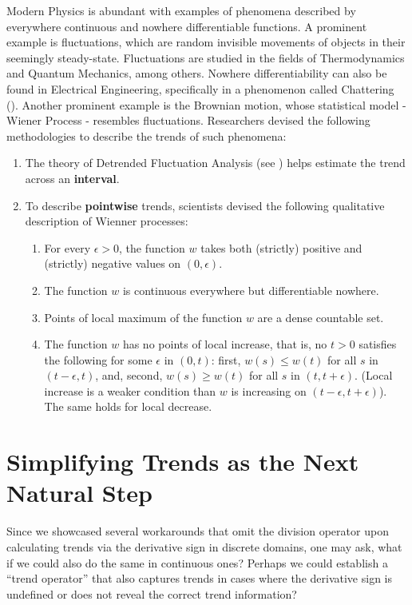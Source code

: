 \documentclass[11pt]{book}
\begin{document}
\label{nowhere_differentiability} Modern Physics is abundant with examples of
phenomena described by everywhere continuous and nowhere differentiable
functions. A prominent example is fluctuations, which are random invisible movements
of objects in their seemingly steady-state. Fluctuations are studied in the
fields of Thermodynamics and Quantum Mechanics, among others.
Nowhere differentiability can also be found in Electrical Engineering, specifically in a phenomenon
called Chattering (\cite{levant2010chattering}). Another prominent
example is the Brownian motion, whose statistical model - Wiener Process
- resembles fluctuations. Researchers devised the following methodologies
to describe the trends of such phenomena:
\begin{enumerate}
\item The theory of Detrended Fluctuation Analysis (see \cite{peng1994mosaic})
helps estimate the trend across an \textbf{interval}.
\item To describe \textbf{pointwise} trends, scientists devised the following
qualitative description of Wienner processes:
\begin{enumerate}
\item For every $\epsilon>0$, the function $w$ takes both (strictly) positive
and (strictly) negative values on $\left(0,\epsilon\right)$.
\item The function $w$ is continuous everywhere but differentiable nowhere.
\item Points of local maximum of the function $w$ are a dense countable
set.
\item The function $w$ has no points of local increase, that is, no $t>0$
satisfies the following for some $\epsilon$ in $\left(0,t\right)$:
first, $w\left(s\right)\leq w\left(t\right)$ for all $s$ in $\left(t-\epsilon,t\right)$,
and, second, $w\left(s\right)\geq w\left(t\right)$ for all $s$ in
$\left(t,t+\epsilon\right)$. (Local increase is a weaker condition
than $w$ is increasing on $\left(t-\epsilon,t+\epsilon\right)$).
The same holds for local decrease.
\end{enumerate}
\end{enumerate}

\section{Simplifying Trends as the Next Natural Step}

Since we showcased several workarounds that omit the division operator
upon calculating trends via the derivative sign in discrete domains,
one may ask, what if we could also do the same in continuous ones?
Perhaps we could establish a “trend operator” that also captures trends
in cases where the derivative sign is undefined or does not reveal
the correct trend information?
\end{document}

